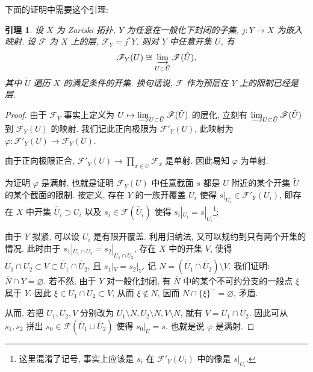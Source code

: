 \documentclass{article}
\theoremstyle{exercise}
\theoremstyle{theorem}
\newtheorem*{lemma*}{引理}
\theoremstyle{remark}
\def\cF{\mathscr{F}}
\begin{document}
下面的证明中需要这个引理:
\begin{lemma*}
  设 $X$ 为 Zariski 拓扑, $Y$ 为任意在一般化下封闭的子集, $j \colon Y \to X$ 为嵌入映射.
  设 $\cF$ 为 $X$ 上的层, $\cF_Y = j^*Y$. 则对 $Y$ 中任意开集 $U$, 有
  \[
    \cF_Y(U) \cong \varinjlim_{U \subset \tilde{U}} \cF(\tilde{U}),
  \]
  其中 $\tilde{U}$ 遍历 $X$ 的满足条件的开集.
  换句话说, $\cF$ 作为预层在 $Y$ 上的限制已经是层.
\end{lemma*}

\begin{proof}
  由于 $\cF_Y$ 事实上定义为 $U \mapsto \varinjlim_{U \subset \tilde{U}} \cF(\tilde{U})$ 的层化,
  立刻有 $\varinjlim_{U \subset \tilde{U}} \cF(\tilde{U})$ 到 $\cF_Y(U)$ 的映射.
  我们记此正向极限为 $\cF'_Y(U)$, 此映射为 $\varphi \colon \cF'_Y(U) \to \cF_Y(U)$.

  由于正向极限正合, $\cF'_Y(U) \to \prod_{x \in U} \cF_x$ 是单射. 因此易知 $\varphi$ 为单射.

  为证明 $\varphi$ 是满射, 也就是证明 $\cF_Y(U)$ 中任意截面 $s$ 都是 $U$ 附近的某个开集 $\tilde{U}$ 的某个截面的限制.
  按定义, 存在 $Y$ 的一族开覆盖 $U_i$ 使得 $s|_{U_i} \in \cF'_Y(U_i)$,
  即存在 $X$ 中开集 $\tilde{U_i} \supset U_i$ 以及 $s_i \in \cF(\tilde{U_i})$
  使得 $s_i|_{U_i} = s|_{U_i}$\footnote{这里混淆了记号, 事实上应该是 $s_i$ 在 $\cF'_Y(U_i)$ 中的像是 $s|_{U_i}$.};

  由于 $Y$ 拟紧, 可以设 $U_i$ 是有限开覆盖. 利用归纳法, 又可以规约到只有两个开集的情况.
  此时由于 $s_1|_{U_1 \cap U_2} = s_2|_{U_1 \cap U_2}$, 存在 $X$ 中的开集 $V$,
  使得 $U_1 \cap U_2 \subset V \subset \tilde{U_1} \cap \tilde{U_2}$,
  且 $s_1|_V = s_2|_V$.
  记 $N = (\tilde{U_1} \cap \tilde{U_2}) \setminus V$. 我们证明: $\overline{N} \cap Y = \varnothing$.
  若不然, 由于 $Y$ 对一般化封闭, 有 $\overline{N}$ 中的某个不可约分支的一般点 $\xi$ 属于 $Y$.
  因此 $\xi \in U_1 \cap U_2 \subset V$, 从而 $\xi \notin N$, 因而 $N \cap \{\xi\}^- = \varnothing$, 矛盾.

  从而, 若把 $U_1, U_2, V$ 分别改为 $U_1 \setminus \overline{N}, U_2 \setminus \overline{N}, V \setminus \overline{N}$,
  就有 $V = U_1 \cap U_2$. 因此可从 $s_1, s_2$ 拼出 $s_0 \in \cF(\tilde{U_1} \cup \tilde{U_2})$
  使得 $s_0|_U = s$. 也就是说 $\varphi$ 是满射. \qedhere
\end{proof}
\end{document}
